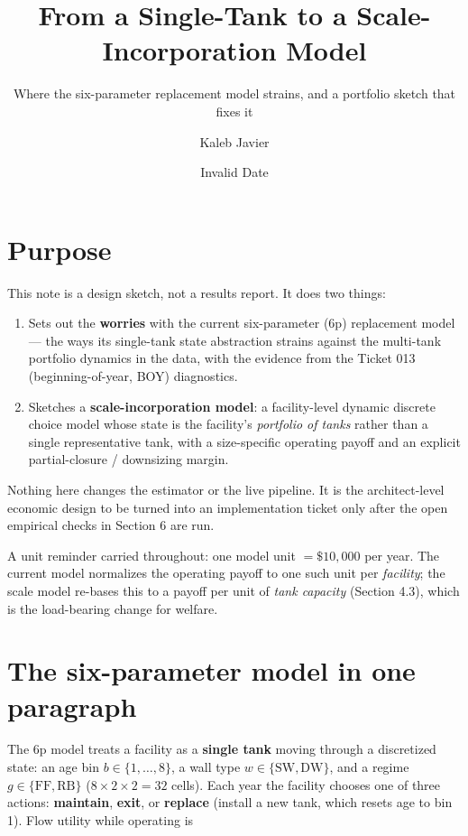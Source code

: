 \documentclass[
  letterpaper,
  DIV=11,
  numbers=noendperiod]{scrartcl}
\title{From a Single-Tank to a Scale-Incorporation Model}
\subtitle{Where the six-parameter replacement model strains, and a
portfolio sketch that fixes it}
\author{Kaleb Javier}
\date{Invalid Date}
\providecommand{\tightlist}{%
  \setlength{\itemsep}{0pt}\setlength{\parskip}{0pt}}\usepackage{longtable,booktabs,array}
\begin{document}
\maketitle

\section{Purpose}\label{purpose}

This note is a design sketch, not a results report. It does two things:

\begin{enumerate}
\def\labelenumi{\arabic{enumi}.}
\tightlist
\item
  Sets out the \textbf{worries} with the current six-parameter (6p)
  replacement model --- the ways its single-tank state abstraction
  strains against the multi-tank portfolio dynamics in the data, with
  the evidence from the Ticket 013 (beginning-of-year, BOY) diagnostics.
\item
  Sketches a \textbf{scale-incorporation model}: a facility-level
  dynamic discrete choice model whose state is the facility's
  \emph{portfolio of tanks} rather than a single representative tank,
  with a size-specific operating payoff and an explicit partial-closure
  / downsizing margin.
\end{enumerate}

Nothing here changes the estimator or the live pipeline. It is the
architect-level economic design to be turned into an implementation
ticket only after the open empirical checks in Section 6 are run.

\medskip

A unit reminder carried throughout: one model unit \(= \$10{,}000\) per
year. The current model normalizes the operating payoff to one such unit
per \emph{facility}; the scale model re-bases this to a payoff per unit
of \emph{tank capacity} (Section 4.3), which is the load-bearing change
for welfare.

\section{The six-parameter model in one
paragraph}\label{the-six-parameter-model-in-one-paragraph}

The 6p model treats a facility as a \textbf{single tank} moving through
a discretized state: an age bin \(b \in \{1,\dots,8\}\), a wall type
\(w \in \{\text{SW},
\text{DW}\}\), and a regime \(g \in \{\text{FF}, \text{RB}\}\)
(\(8 \times 2 \times 2
= 32\) cells). Each year the facility chooses one of three actions:
\textbf{maintain}, \textbf{exit}, or \textbf{replace} (install a new
tank, which resets age to bin 1). Flow utility while operating is
\end{document}
